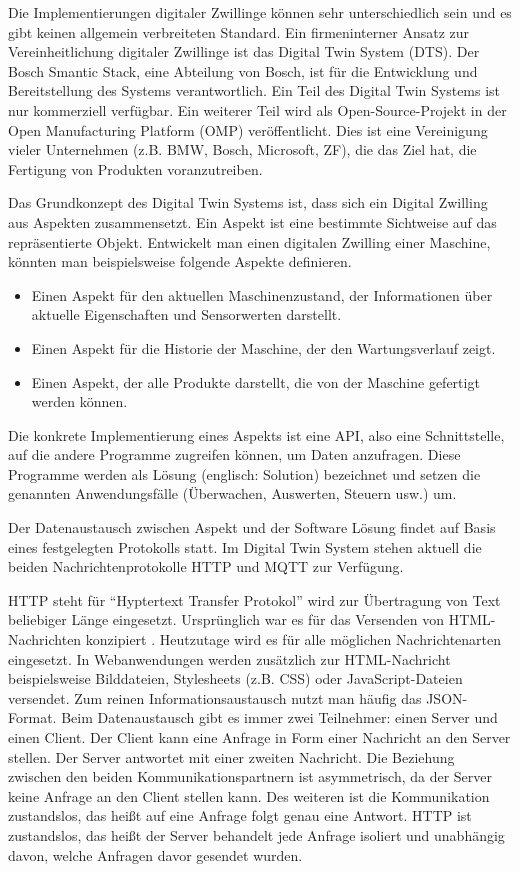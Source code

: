Die Implementierungen digitaler Zwillinge können sehr unterschiedlich sein und es gibt keinen allgemein verbreiteten Standard. Ein firmeninterner Ansatz zur Vereinheitlichung digitaler Zwillinge ist das Digital Twin System (DTS). Der Bosch Smantic Stack, eine Abteilung von Bosch, ist für die Entwicklung und Bereitstellung des Systems verantwortlich. Ein Teil des Digital Twin Systems ist nur kommerziell verfügbar. Ein weiterer Teil wird als Open-Source-Projekt in der Open Manufacturing Platform (OMP) veröffentlicht. Dies ist eine Vereinigung vieler Unternehmen (z.B. BMW, Bosch, Microsoft, ZF), die das Ziel hat, die Fertigung von Produkten voranzutreiben. \cite[vgl.][]{omp2020omp}

Das Grundkonzept des Digital Twin Systems ist, dass sich ein Digital Zwilling aus Aspekten zusammensetzt. Ein Aspekt ist eine bestimmte Sichtweise auf das repräsentierte Objekt. Entwickelt man einen digitalen Zwilling einer Maschine, könnten man beispielsweise folgende Aspekte definieren. 
\begin{itemize}
	\item Einen Aspekt für den aktuellen Maschinenzustand, der Informationen über aktuelle Eigenschaften und Sensorwerten darstellt.
	\item Einen Aspekt für die Historie der Maschine, der den Wartungsverlauf zeigt.
	\item Einen Aspekt, der alle Produkte darstellt, die von der Maschine gefertigt werden können.
\end{itemize}

Die konkrete Implementierung eines Aspekts ist eine API, also eine Schnittstelle, auf die andere Programme zugreifen können, um Daten anzufragen. Diese Programme werden als Lösung (englisch: Solution) bezeichnet und setzen die genannten Anwendungsfälle (Überwachen, Auswerten, Steuern usw.) um.

Der Datenaustausch zwischen Aspekt und der Software Lösung findet auf Basis eines festgelegten Protokolls statt. Im Digital Twin System stehen aktuell die beiden Nachrichtenprotokolle HTTP und MQTT zur Verfügung. 

HTTP steht für "`Hyptertext Transfer Protokol"' wird zur Übertragung von Text beliebiger Länge eingesetzt. Ursprünglich war es für das Versenden von HTML-Nachrichten konzipiert \cite{bernerslee1991http}. Heutzutage wird es für alle möglichen Nachrichtenarten eingesetzt. In Webanwendungen werden zusätzlich zur HTML-Nachricht beispielsweise Bilddateien, Stylesheets (z.B. CSS) oder JavaScript-Dateien versendet. Zum reinen Informationsaustausch nutzt man häufig das JSON-Format.
Beim Datenaustausch gibt es immer zwei Teilnehmer: einen Server und einen Client. Der Client kann eine Anfrage in Form einer Nachricht an den Server stellen. Der Server antwortet mit einer zweiten Nachricht. Die Beziehung zwischen den beiden Kommunikationspartnern ist asymmetrisch, da der Server keine Anfrage an den Client stellen kann. Des weiteren ist die Kommunikation zustandslos, das heißt auf eine Anfrage folgt genau eine Antwort. HTTP ist zustandslos, das heißt der Server behandelt jede Anfrage isoliert und unabhängig davon, welche Anfragen davor gesendet wurden. \cite[vgl.][]{fielding1999http}

